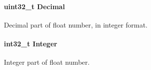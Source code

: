 \paragraph[{Decimal}]{\setlength{\rightskip}{0pt plus 5cm}uint32\+\_\+t Decimal}\label{struct_t_m___g_p_s___float__t_a1f1a4005542eb36b6420473d24d99a42}
Decimal part of float number, in integer format. \hypertarget{struct_t_m___g_p_s___float__t_a4cf167ca72295ce98fe58afd65ef5b5e}{}
\paragraph[{Integer}]{\setlength{\rightskip}{0pt plus 5cm}int32\+\_\+t Integer}\label{struct_t_m___g_p_s___float__t_a4cf167ca72295ce98fe58afd65ef5b5e}
Integer part of float number. 